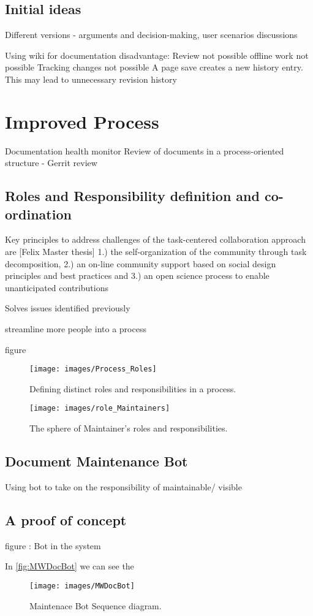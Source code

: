 \subsection{Initial ideas }

Different versions - arguments and decision-making, user scenarios discussions


Using wiki for documentation disadvantage:
Review not possible
offline work not possible
Tracking changes not possible
A page save creates a new history entry. This may lead to unnecessary revision history 

\section{Improved Process}
Documentation health monitor
Review of documents in a process-oriented structure - Gerrit review 

\subsection{Roles and Responsibility definition and co-ordination}

Key principles to address challenges of the task-centered collaboration approach are [Felix Master thesis]
1.) the self-organization of the community through task decomposition, 
2.) an on-line community support based on social design principles and best practices and
 3.) an open science process to enable unanticipated contributions

	Solves issues identified previously
 	
 	streamline more people into a process
 	
 figure	
 
 \begin{figure}[H]
  \centering
  \texttt{[image: images/Process\_Roles]}
  \caption[Defining distinct roles and responsibilities in a process]{Defining distinct roles and responsibilities in a process.}\label{fig:Process_Roles}
\end{figure}

 \begin{figure}[H]
  \centering
  \texttt{[image: images/role\_Maintainers]}
  \caption[The sphere of Maintainer's roles and responsibilities]{The sphere of Maintainer's roles and responsibilities.}\label{fig:role_Maintainers}
\end{figure}

\subsection{Document Maintenance Bot}
Using bot to take on the responsibility of 
maintainable/ visible


\subsection{A proof of concept}
figure : Bot in the system

In \autoref{fig:MWDocBot}  we can see the 
\begin{figure}[H]
  \centering
  \texttt{[image: images/MWDocBot]}
  \caption[Maintenace Bot Sequence diagram]{Maintenace Bot Sequence diagram.}\label{fig:MWDocBot}
\end{figure}